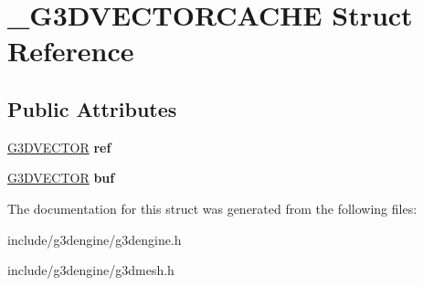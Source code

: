 \hypertarget{struct__G3DVECTORCACHE}{}\section{\+\_\+\+G3\+D\+V\+E\+C\+T\+O\+R\+C\+A\+C\+HE Struct Reference}
\label{struct__G3DVECTORCACHE}
\subsection*{Public Attributes}
\begin{DoxyCompactItemize}
\item 
\mbox{\label{struct__G3DVECTORCACHE_ab84ecab4255c76858023da004cf79902}} 
\hyperlink{structG3DVECTOR}{G3\+D\+V\+E\+C\+T\+OR} {\bfseries ref}
\item 
\mbox{\label{struct__G3DVECTORCACHE_a43fdbf2d534d23bcfd67df54a9c575bb}} 
\hyperlink{structG3DVECTOR}{G3\+D\+V\+E\+C\+T\+OR} {\bfseries buf}
\end{DoxyCompactItemize}


The documentation for this struct was generated from the following files\+:\begin{DoxyCompactItemize}
\item 
include/g3dengine/g3dengine.\+h\item 
include/g3dengine/g3dmesh.\+h\end{DoxyCompactItemize}
